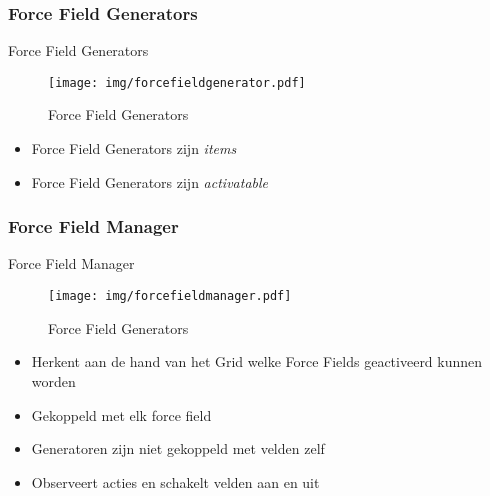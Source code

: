 \documentclass[t]{beamer}
\begin{document}
\subsubsection{Force Field Generators}
\begin{frame}{Force Field Generators}
\begin{figure}
	\center
	\texttt{[image: img/forcefieldgenerator.pdf]}
	\caption{Force Field Generators}
\end{figure}
\begin{itemize}
	\item Force Field Generators zijn \textit{items}
	\item Force Field Generators zijn \textit{activatable}
\end{itemize}
\end{frame}

\subsubsection{Force Field Manager}
\begin{frame}{Force Field Manager}
\begin{multicols}{2}
\begin{figure}
	\center
	\texttt{[image: img/forcefieldmanager.pdf]}
	\caption{Force Field Generators}
\end{figure}

\begin{itemize}
	\item Herkent aan de hand van het Grid welke Force Fields geactiveerd kunnen worden
	\item Gekoppeld met elk force field
	\item Generatoren zijn niet gekoppeld met velden zelf
	\item Observeert acties en schakelt velden aan en uit
\end{itemize}
\end{multicols}
\end{frame}
\end{document}

